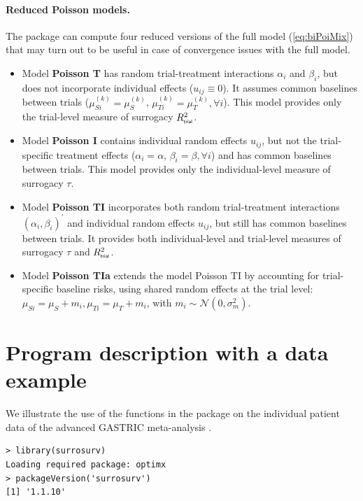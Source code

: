 \documentclass[]{scrartcl}\usepackage[]{graphicx}\usepackage[]{color}
\begin{document}
{{%
\paragraph{Reduced Poisson models.}
The  package can compute four reduced versions 
  of the full model (\ref{eq:biPoiMix})
  that may turn out to be useful in case of convergence issues with the full model.
\begin{itemize}
\item Model \textbf{Poisson T} has
  random trial-treatment interactions $\alpha_i$ and $\beta_i$,
  but does not incorporate individual effects ($u_{ij} \equiv 0$).
It assumes common baselines between trials
($\mu^{(k)}_{Si} = \mu^{(k)}_{S}$, $\mu^{(k)}_{Ti} = \mu^{(k)}_{T},
\forall i$).
This model provides only the trial-level measure of surrogacy
$R^2_{\textsf{\tiny trial}}$.

\item Model \textbf{Poisson I} contains individual random effects $u_{ij}$,
but not the trial-specific treatment effects 
($\alpha_i = \alpha$, $\beta_i = \beta, \forall i$)
and has common baselines between trials.
This model provides only the individual-level measure of surrogacy
$\tau$.

\item Model \textbf{Poisson TI} incorporates
both random trial-treatment interactions
$(\alpha_i, \beta_i)^\prime$
and individual random effects $u_{ij}$,
but still has common baselines between trials.
It provides both individual-level and trial-level measures of surrogacy
$\tau$ and $R^2_{\textsf{\tiny trial}}$.

\item Model \textbf{Poisson TIa} extends the model Poisson TI
by accounting for trial-specific baseline risks,
using shared random effects at the trial level:
$\mu_{Si} = \mu_S + m_i, \mu_{Ti} = \mu_T + m_i$,
with $m_i\sim\mathcal N(0, \sigma^2_m)$.
\end{itemize}



\section{Program description with a data example}
We illustrate the use of the functions in the  package
  on the individual patient data of the advanced GASTRIC meta-analysis
\citep{GASTRIC13, Paoletti2013}.
\begin{lstlisting}
> library(surrosurv)
Loading required package: optimx
> packageVersion('surrosurv')
[1] '1.1.10'
\end{lstlisting}

}}
\end{document}
